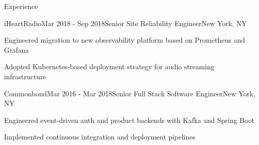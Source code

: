 \documentclass[
	11pt, %
]{resume} %
\begin{document}
\begin{rSection}{Experience}

    \begin{rSubsection}{iHeartRadio}{Mar 2018 - Sep 2018}{Senior Site Reliability Engineer}{New York, NY}
        \item Engineered migration to new observability platform based on Prometheus and Grafana
        \item Adopted Kubernetes-based deployment strategy for audio streaming infrastructure
    \end{rSubsection}


    \begin{rSubsection}{Commonbond}{Mar 2016 - Mar 2018}{Senior Full Stack Software Engineer}{New York, NY}
        \item Engineered event-driven auth and product backends with Kafka and Spring Boot
        \item Implemented continuous integration and deployment pipelines
    \end{rSubsection}

\end{rSection}





\end{document}
